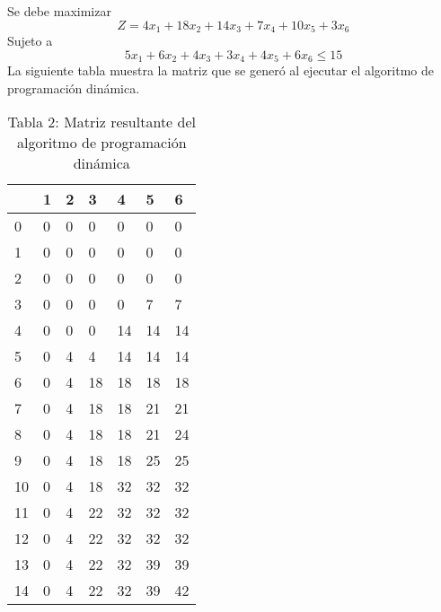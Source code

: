 \documentclass{article}
\begin{document}
Se debe maximizar $$Z = 4x_1+18x_2+14x_3+7x_4+10x_5+3x_6$$ 
Sujeto a $$5x_1+6x_2+4x_3+3x_4+4x_5+6x_6\leq 15$$
La siguiente tabla muestra la matriz que se generó al ejecutar el algoritmo de programación dinámica.
\begin{table}[h]
\centering
\caption*{Tabla 2: Matriz resultante del algoritmo de programación dinámica}
\begin{tabularx}{\textwidth}{|X|X|X|X|X|X|X|}
\hline&1&2&3&4&5&6 \\
\hline 0&\cellcolor{red}0&\cellcolor{red}0&\cellcolor{red}0&\cellcolor{red}0&\cellcolor{red}0&\cellcolor{red}0\\
\hline 1&\cellcolor{red}0&\cellcolor{red}0&\cellcolor{red}0&\cellcolor{red}0&\cellcolor{red}0&\cellcolor{red}0\\
\hline 2&\cellcolor{red}0&\cellcolor{red}0&\cellcolor{red}0&\cellcolor{red}0&\cellcolor{red}0&\cellcolor{red}0\\
\hline 3&\cellcolor{red}0&\cellcolor{red}0&\cellcolor{red}0&\cellcolor{red}0&\cellcolor{green}7&\cellcolor{red}7\\
\hline 4&\cellcolor{red}0&\cellcolor{red}0&\cellcolor{red}0&\cellcolor{green}14&\cellcolor{red}14&\cellcolor{red}14\\
\hline 5&\cellcolor{red}0&\cellcolor{green}4&\cellcolor{red}4&\cellcolor{green}14&\cellcolor{red}14&\cellcolor{red}14\\
\hline 6&\cellcolor{red}0&\cellcolor{green}4&\cellcolor{green}18&\cellcolor{red}18&\cellcolor{red}18&\cellcolor{red}18\\
\hline 7&\cellcolor{red}0&\cellcolor{green}4&\cellcolor{green}18&\cellcolor{red}18&\cellcolor{green}21&\cellcolor{red}21\\
\hline 8&\cellcolor{red}0&\cellcolor{green}4&\cellcolor{green}18&\cellcolor{red}18&\cellcolor{green}21&\cellcolor{green}24\\
\hline 9&\cellcolor{red}0&\cellcolor{green}4&\cellcolor{green}18&\cellcolor{red}18&\cellcolor{green}25&\cellcolor{red}25\\
\hline 10&\cellcolor{red}0&\cellcolor{green}4&\cellcolor{green}18&\cellcolor{green}32&\cellcolor{red}32&\cellcolor{red}32\\
\hline 11&\cellcolor{red}0&\cellcolor{green}4&\cellcolor{green}22&\cellcolor{green}32&\cellcolor{red}32&\cellcolor{red}32\\
\hline 12&\cellcolor{red}0&\cellcolor{green}4&\cellcolor{green}22&\cellcolor{green}32&\cellcolor{red}32&\cellcolor{red}32\\
\hline 13&\cellcolor{red}0&\cellcolor{green}4&\cellcolor{green}22&\cellcolor{green}32&\cellcolor{green}39&\cellcolor{red}39\\
\hline 14&\cellcolor{red}0&\cellcolor{green}4&\cellcolor{green}22&\cellcolor{green}32&\cellcolor{green}39&\cellcolor{green}42\\
\hline
\end{tabularx}
\end{table}
\end{document}
